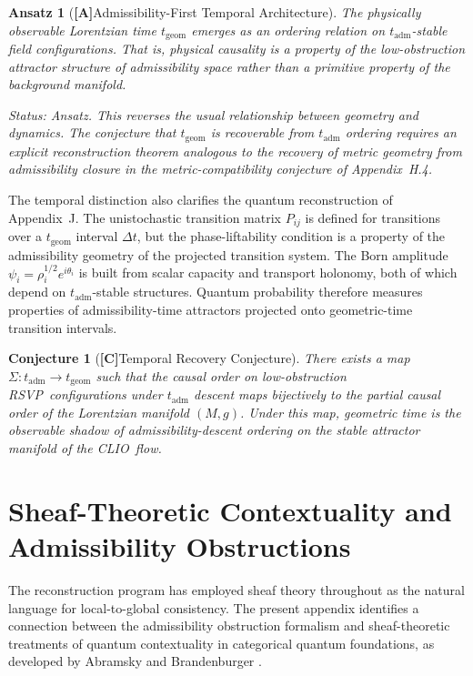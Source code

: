 \documentclass[12pt,a4paper]{article}
\newcommand{\claimA}{\textbf{[A]}\;}
\newcommand{\claimC}{\textbf{[C]}\;}
\newtheorem{ansatz}[definition]{Ansatz}
\newtheorem{appconj}[defn]{Conjecture}
\newcommand{\RSVP}{\textrm{RSVP}}
\newcommand{\CLIO}{\textrm{CLIO}}
\begin{document}
\begin{ansatz}[\claimA Admissibility-First Temporal Architecture]
The physically observable Lorentzian time $t_\mathrm{geom}$ emerges as an
ordering relation on $t_\mathrm{adm}$-stable field configurations. That is,
physical causality is a property of the low-obstruction attractor structure
of admissibility space rather than a primitive property of the background
manifold.

\emph{Status: Ansatz.} This reverses the usual relationship between geometry
and dynamics. The conjecture that $t_\mathrm{geom}$ is recoverable from
$t_\mathrm{adm}$ ordering requires an explicit reconstruction theorem
analogous to the recovery of metric geometry from admissibility closure in
the metric-compatibility conjecture of Appendix~H.4.
\end{ansatz}

The temporal distinction also clarifies the quantum reconstruction of
Appendix~J. The unistochastic transition matrix $P_{ij}$ is defined for
transitions over a $t_\mathrm{geom}$ interval $\Delta t$, but the
phase-liftability condition is a property of the admissibility geometry of the
projected transition system. The Born amplitude
$\psi_i=\rho_i^{1/2}e^{i\theta_i}$ is built from scalar capacity and transport
holonomy, both of which depend on $t_\mathrm{adm}$-stable structures. Quantum
probability therefore measures properties of admissibility-time attractors
projected onto geometric-time transition intervals.

\begin{appconj}[\claimC Temporal Recovery Conjecture]
There exists a map $\Sigma: t_\mathrm{adm}\to t_\mathrm{geom}$ such that
the causal order on low-obstruction \RSVP\ configurations under $t_\mathrm{adm}$
descent maps bijectively to the partial causal order of the Lorentzian manifold
$(M,g)$. Under this map, geometric time is the observable shadow of
admissibility-descent ordering on the stable attractor manifold of the \CLIO\
flow.
\end{appconj}

\section{Sheaf-Theoretic Contextuality and Admissibility Obstructions}

The reconstruction program has employed sheaf theory throughout as the
natural language for local-to-global consistency. The present appendix
identifies a connection between the admissibility obstruction formalism
and sheaf-theoretic treatments of quantum contextuality in categorical
quantum foundations, as developed by Abramsky and Brandenburger \cite{AbramskyBrandenburger2011}.
\end{document}
